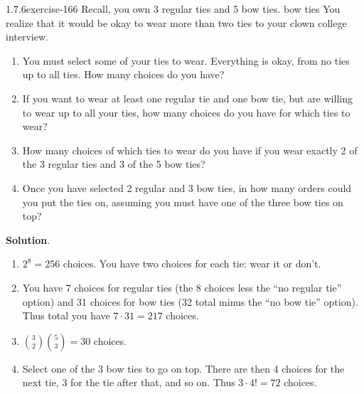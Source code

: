 \documentclass[twoside,11pt,]{book}
\numberwithin{equation}{chapter}
\begin{document}
\begin{divisionsolution}{1.7.6}{}{exercise-166}%
\hypertarget{p-2718}{}%
Recall, you own 3 regular ties and 5 bow ties. bow ties You realize that it would be okay to wear more than two ties to your clown college interview.\leavevmode%
\begin{enumerate}[label=(\alph*)]
\item\hypertarget{li-1616}{}\hypertarget{p-2719}{}%
You must select some of your ties to wear. Everything is okay, from no ties up to all ties. How many choices do you have?%
\item\hypertarget{li-1617}{}\hypertarget{p-2721}{}%
If you want to wear at least one regular tie and one bow tie, but are willing to wear up to all your ties, how many choices do you have for which ties to wear?%
\item\hypertarget{li-1618}{}\hypertarget{p-2723}{}%
How many choices of which ties to wear do you have if you wear exactly 2 of the 3 regular ties and 3 of the 5 bow ties?%
\item\hypertarget{li-1619}{}\hypertarget{p-2725}{}%
Once you have selected 2 regular and 3 bow ties, in how many orders could you put the ties on, assuming you must have one of the three bow ties on top?%
\end{enumerate}
%
\par\smallskip%
\noindent\textbf{Solution}.\quad%
\hypertarget{p-2727}{}%
\leavevmode%
\begin{enumerate}[label=(\alph*)]
\item\hypertarget{li-1620}{}\hypertarget{p-2728}{}%
\(2^8 = 256\) choices. You have two choices for each tie: wear it or don't.%
\item\hypertarget{li-1621}{}\hypertarget{p-2729}{}%
You have 7 choices for regular ties (the 8 choices less the ``no regular tie'' option) and 31 choices for bow ties (32 total minus the ``no bow tie'' option). Thus total you have \(7 \cdot 31 = 217\) choices.%
\item\hypertarget{li-1622}{}\hypertarget{p-2730}{}%
\({3\choose 2}{5\choose 3} = 30\) choices.%
\item\hypertarget{li-1623}{}\hypertarget{p-2731}{}%
Select one of the 3 bow ties to go on top. There are then 4 choices for the next tie, 3 for the tie after that, and so on. Thus \(3\cdot 4! = 72\) choices.%
\end{enumerate}
%
\end{divisionsolution}%
\end{document}
